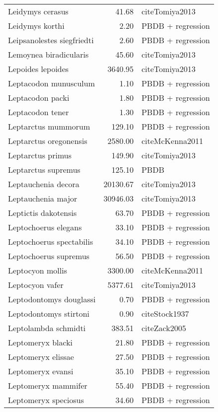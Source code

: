 \begin{table}[ht]
\begin{tabular}{lrl}
  Leidymys cerasus & 41.68 & cite{Tomiya2013} \\ 
  Leidymys korthi & 2.20 & PBDB + regression \\ 
  Leipsanolestes siegfriedti & 2.60 & PBDB + regression \\ 
  Lemoynea biradicularis & 45.60 & cite{Tomiya2013} \\ 
  Lepoides lepoides & 3640.95 & cite{Tomiya2013} \\ 
  Leptacodon munusculum & 1.10 & PBDB + regression \\ 
  Leptacodon packi & 1.80 & PBDB + regression \\ 
  Leptacodon tener & 1.30 & PBDB + regression \\ 
  Leptarctus mummorum & 129.10 & PBDB + regression \\ 
  Leptarctus oregonensis & 2580.00 & cite{McKenna2011} \\ 
  Leptarctus primus & 149.90 & cite{Tomiya2013} \\ 
  Leptarctus supremus & 125.10 & PBDB \\ 
  Leptauchenia decora & 20130.67 & cite{Tomiya2013} \\ 
  Leptauchenia major & 30946.03 & cite{Tomiya2013} \\ 
  Leptictis dakotensis & 63.70 & PBDB + regression \\ 
  Leptochoerus elegans & 33.10 & PBDB + regression \\ 
  Leptochoerus spectabilis & 34.10 & PBDB + regression \\ 
  Leptochoerus supremus & 56.50 & PBDB + regression \\ 
  Leptocyon mollis & 3300.00 & cite{McKenna2011} \\ 
  Leptocyon vafer & 5377.61 & cite{Tomiya2013} \\ 
  Leptodontomys douglassi & 0.70 & PBDB + regression \\ 
  Leptodontomys stirtoni & 0.90 & cite{Stock1937} \\ 
  Leptolambda schmidti & 383.51 & cite{Zack2005} \\ 
  Leptomeryx blacki & 21.80 & PBDB + regression \\ 
  Leptomeryx elissae & 27.50 & PBDB + regression \\ 
  Leptomeryx evansi & 35.10 & PBDB + regression \\ 
  Leptomeryx mammifer & 55.40 & PBDB + regression \\ 
  Leptomeryx speciosus & 34.60 & PBDB + regression \\ 

\end{tabular}
\end{table}
